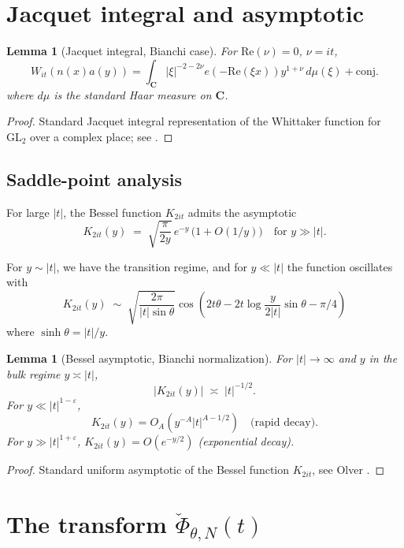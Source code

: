 \documentclass[11pt]{article}
\newtheorem{lemma}[theorem]{Lemma}
\theoremstyle{definition}
\newcommand{\C}{\mathbf{C}}
\renewcommand{\Re}{\mathrm{Re}}
\begin{document}
\section{Jacquet integral and asymptotic}\label{sec:jacquet}

\begin{lemma}[Jacquet integral, Bianchi case]\label{lem:jacquet}
For $\Re(\nu)=0$, $\nu=it$,
\[
W_{it}(n(x)a(y))=\int_\C |\xi|^{-2-2\nu}e(-\Re(\xi x))y^{1+\nu}\,d\mu(\xi)+\text{conj.}
\]
where $d\mu$ is the standard Haar measure on $\C$.
\end{lemma}

\begin{proof}
Standard Jacquet integral representation of the Whittaker function for $\mathrm{GL}_2$ over a complex place; see \cite{jacquet-langlands}.
\end{proof}

\subsection{Saddle-point analysis}

For large $|t|$, the Bessel function $K_{2it}$ admits the asymptotic
\[
K_{2it}(y)\;=\;\sqrt{\frac{\pi}{2y}}\,e^{-y}\,\Big(1+O(1/y)\Big)\quad\text{for }y\gg|t|.
\]

For $y\sim|t|$, we have the transition regime, and for $y\ll|t|$ the function oscillates with
\[
K_{2it}(y)\;\sim\;\sqrt{\frac{2\pi}{|t|\sin\theta}}\cos(2t\theta-2t\log\frac{y}{2|t|}\sin\theta-\pi/4)
\]
where $\sinh\theta=|t|/y$.

\begin{lemma}[Bessel asymptotic, Bianchi normalization]\label{lem:bessel-asymp}
For $|t|\to\infty$ and $y$ in the bulk regime $y\asymp|t|$,
\[
|K_{2it}(y)|\;\asymp\;|t|^{-1/2}.
\]
For $y\ll|t|^{1-\varepsilon}$,
\[
K_{2it}(y)=O_A(y^{-A}|t|^{A-1/2})\quad\text{(rapid decay)}.
\]
For $y\gg|t|^{1+\varepsilon}$, $K_{2it}(y)=O(e^{-y/2})$ (exponential decay).
\end{lemma}

\begin{proof}
Standard uniform asymptotic of the Bessel function $K_{2it}$, see Olver \cite{olver}.
\end{proof}

\section{The transform $\check\Phi_{\theta,N}(t)$}\label{sec:transform}
\end{document}
